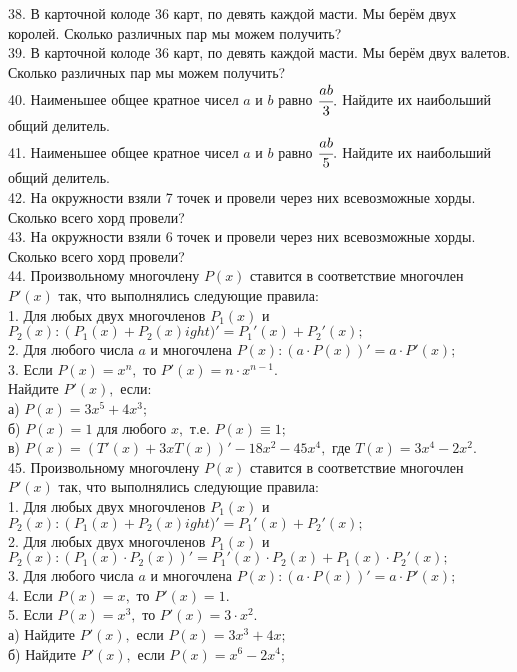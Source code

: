 38. В карточной колоде 36 карт, по девять каждой масти. Мы берём двух королей. Сколько различных пар мы можем получить?\\
39. В карточной колоде 36 карт, по девять каждой масти. Мы берём двух валетов. Сколько различных пар мы можем получить?\\
40. Наименьшее общее кратное чисел $a$ и $b$ равно $\cfrac{ab}{3}.$ Найдите их наибольший общий делитель.\\
41. Наименьшее общее кратное чисел $a$ и $b$ равно $\cfrac{ab}{5}.$ Найдите их наибольший общий делитель.\\
42. На окружности взяли 7 точек и провели через них всевозможные хорды. Сколько всего хорд провели?\\
43. На окружности взяли 6 точек и провели через них всевозможные хорды. Сколько всего хорд провели?\\
44. Произвольному многочлену $P(x)$ ставится в соответствие многочлен $P'(x)$ так, что выполнялись следующие правила:\\
1. Для любых двух многочленов $P_1(x)$ и $P_2(x): \left(P_1(x)+P_2(x)
ight)'=P_1'(x)+P_2'(x);$\\
2. Для любого числа $a$ и многочлена $P(x): (a\cdot P(x))'=a\cdot P'(x);$\\
3. Если $P(x)=x^n,$ то $P'(x)=n\cdot x^{n-1}.$\\
Найдите $P'(x),$ если:\\
а) $P(x)=3x^5+4x^3;$\\
б) $P(x)=1$ для любого $x,$ т.е. $P(x)\equiv 1;$\\
в) $P(x)=(T'(x)+3xT(x))'-18x^2-45x^4,$ где $T(x)=3x^4-2x^2.$\\
45. Произвольному многочлену $P(x)$ ставится в соответствие многочлен $P'(x)$ так, что выполнялись следующие правила:\\
1. Для любых двух многочленов $P_1(x)$ и $P_2(x): \left(P_1(x)+P_2(x)
ight)'=P_1'(x)+P_2'(x);$\\
2. Для любых двух многочленов $P_1(x)$ и $P_2(x): (P_1(x)\cdot P_2(x))'=P_1'(x)\cdot P_2(x)+P_1(x)\cdot P_2'(x);$\\
3. Для любого числа $a$ и многочлена $P(x): (a\cdot P(x))'=a\cdot P'(x);$\\
4. Если $P(x)=x,$ то $P'(x)=1.$\\
5. Если $P(x)=x^3,$ то $P'(x)=3\cdot x^2.$\\
а) Найдите $P'(x),$ если $P(x)=3x^3+4x;$\\
б) Найдите $P'(x),$ если $P(x)=x^6-2x^4;$\\
